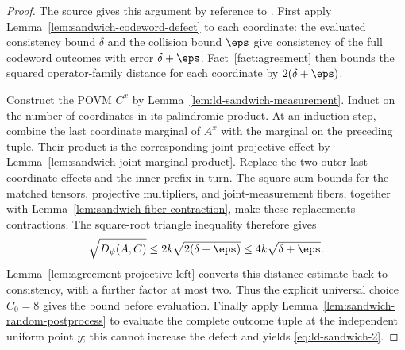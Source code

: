 \begin{proof}
	\leanok
	The source gives this argument by reference to
	\cite[Fact~4.34]{Natarajan2018NEEXP}. First apply
	Lemma~\ref{lem:sandwich-codeword-defect} to each coordinate: the evaluated
	consistency bound $\delta$ and the collision bound $\eps$ give consistency
	of the full codeword outcomes with error $\delta+\eps$. Fact~\ref{fact:agreement}
	then bounds the squared operator-family distance for each coordinate by
	$2(\delta+\eps)$.

	Construct the POVM $C^x$ by Lemma~\ref{lem:ld-sandwich-measurement}. Induct
	on the number of coordinates in its palindromic product. At an induction
	step, combine the last coordinate marginal of $A^x$ with the marginal on the
	preceding tuple. Their product is the corresponding joint projective effect
	by Lemma~\ref{lem:sandwich-joint-marginal-product}. Replace the two outer
	last-coordinate effects and the inner prefix in turn. The square-sum bounds
	for the matched tensors, projective multipliers, and joint-measurement fibers,
	together with Lemma~\ref{lem:sandwich-fiber-contraction}, make these
	replacements contractions. The square-root triangle inequality therefore
	gives
	\[
		\sqrt{D_\psi(A,C)}
		\leq 2k\sqrt{2(\delta+\eps)}
		\leq 4k\sqrt{\delta+\eps}.
	\]
	Lemma~\ref{lem:agreement-projective-left} converts this distance estimate
	back to consistency, with a further factor at most two. Thus the explicit
	universal choice $C_0=8$ gives the bound before evaluation. Finally apply
	Lemma~\ref{lem:sandwich-random-postprocess} to evaluate the complete outcome
	tuple at the independent uniform point $y$; this cannot increase the defect
	and yields \eqref{eq:ld-sandwich-2}.
\end{proof}

